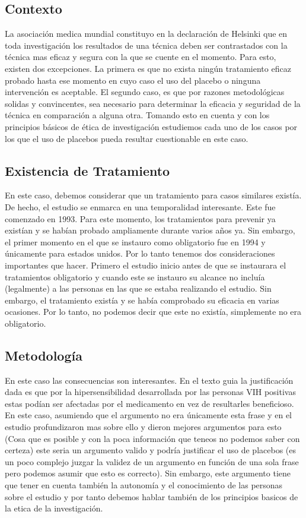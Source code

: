 \documentclass{report}
\begin{document}
\subsection*{Contexto}

La asociación medica mundial constituyo en la declaración de Helsinki que en toda investigación los resultados de una técnica deben ser contrastados con la técnica mas eficaz y segura con la que se cuente en el momento. Para esto, existen dos excepciones. La primera es que no exista ningún tratamiento eficaz probado hasta ese momento en cuyo caso el uso del placebo o ninguna intervención es aceptable. El segundo caso, es que por razones metodológicas solidas y convincentes, sea necesario para determinar la eficacia y seguridad de la técnica en comparación a alguna otra. Tomando esto en cuenta y con los principios básicos de ética de investigación estudiemos cada uno de los casos por los que el uso de placebos pueda resultar cuestionable en este caso.

\subsection*{Existencia de Tratamiento}

En este caso, debemos considerar que un tratamiento para casos similares existía. De hecho, el estudio se enmarca en una temporalidad interesante. Este fue comenzado en 1993. Para este momento, los tratamientos para prevenir ya existían y se habían probado ampliamente durante varios años ya. Sin embargo, el primer momento en el que se instauro como obligatorio fue en 1994 y únicamente para estados unidos. Por lo tanto tenemos dos consideraciones importantes que hacer. Primero el estudio inicio antes de que se instaurara el tratamientos obligatorio y cuando este se instauro su alcance no incluía (legalmente) a las personas en las que se estaba realizando el estudio. Sin embargo, el tratamiento existía y se había comprobado su eficacia en varias ocasiones. Por lo tanto, no podemos decir que este no existía, simplemente no era obligatorio.

\subsection*{Metodología}

En este caso las consecuencias son interesantes. En el texto guia la justificación dada es que por la hipersensibilidad desarrollada por las personas VIH positivas estas podían ser afectadas por el medicamento en vez de resultarles beneficioso. En este caso, asumiendo que el argumento no era únicamente esta frase y en el estudio profundizaron mas sobre ello y dieron mejores argumentos para esto (Cosa que es posible y con la poca información que teneos no podemos saber con certeza) este seria un argumento valido y podría justificar el uso de placebos (es un poco complejo juzgar la validez de un argumento en función de una sola frase pero podemos asumir que esto es correcto). Sin embargo, este argumento tiene que tener en cuenta también la autonomía y el conocimiento de las personas sobre el estudio y por tanto debemos hablar también de los principios basicos de la etica de la investigación.
\end{document}
